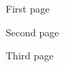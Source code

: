 \documentclass[11pt]{article}
\begin{document}
First page

\pagebreak

Second page

\pagebreak

Third page
\end{document}
